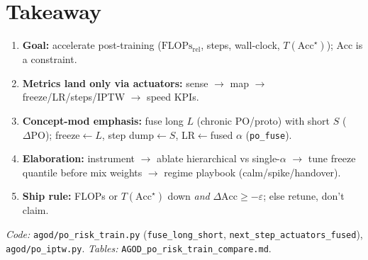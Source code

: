 \documentclass[11pt]{article}
\newcommand{\PO}{\mathrm{PO}}
\newcommand{\Acc}{\mathrm{Acc}}
\newcommand{\Flops}{\mathrm{FLOPs}_{\mathrm{rel}}}
\begin{document}
\section{Takeaway}
\label{sec:take}

\begin{enumerate}[leftmargin=1.4em,itemsep=3pt]
  \item \textbf{Goal:} accelerate post-training
        ($\Flops$, steps, wall-clock, $T(\Acc^\star)$);
        Acc is a constraint.
  \item \textbf{Metrics land only via actuators:}
        sense $\to$ map $\to$ freeze/LR/steps/IPTW $\to$ speed KPIs.
  \item \textbf{Concept-mod emphasis:} fuse long $L$ (chronic PO/proto)
        with short $S$ ($\Delta\PO$); freeze$\leftarrow L$,
        step dump$\leftarrow S$, LR$\leftarrow$fused $\alpha$
        (\texttt{po\_fuse}).
  \item \textbf{Elaboration:} instrument $\to$ ablate hierarchical vs
        single-$\alpha$ $\to$ tune freeze quantile before mix weights
        $\to$ regime playbook (calm/spike/handover).
  \item \textbf{Ship rule:} FLOPs or $T(\Acc^\star)$ down
        \emph{and} $\Delta\Acc\ge-\varepsilon$; else retune, don't claim.
\end{enumerate}

\vspace{0.5em}
\noindent\textit{Code:} \texttt{agod/po\_risk\_train.py}
(\texttt{fuse\_long\_short}, \texttt{next\_step\_actuators\_fused}),
\texttt{agod/po\_iptw.py}.
\textit{Tables:} \texttt{AGOD\_po\_risk\_train\_compare.md}.
\end{document}
